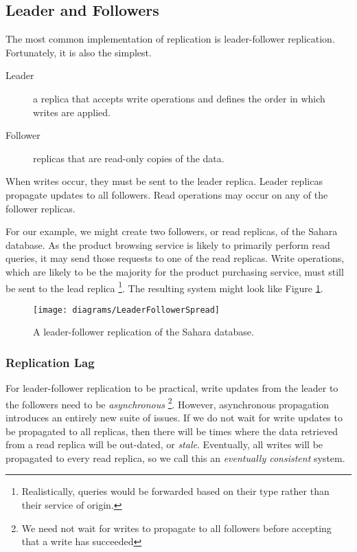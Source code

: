 \subsection{Leader and Followers}
The most common implementation of replication is leader-follower replication.
Fortunately, it is also the simplest.

\begin{description}
    \item[Leader] a replica that accepts write operations and defines the order in which writes are applied.
    \item[Follower] replicas that are read-only copies of the data. 
\end{description}

\noindent
When writes occur, they must be sent to the leader replica.
Leader replicas propagate updates to all followers.
Read operations may occur on any of the follower replicas.

For our example,
we might create two followers, or read replicas,
of the Sahara database.
As the product browsing service is likely to primarily perform read queries,
it may send those requests to one of the read replicas.
Write operations, which are likely to be the majority for the product purchasing service,
must still be sent to the lead replica%
\footnote{Realistically, queries would be forwarded based on their type rather than their service of origin.}.
The resulting system might look like Figure \ref{fig:sahara-leader-follower}.

\begin{figure}[H]
    \begin{center}
    \texttt{[image: diagrams/LeaderFollowerSpread]}
    \end{center}
    \caption{A leader-follower replication of the Sahara database.}
    \label{fig:sahara-leader-follower}
\end{figure}

\subsubsection*{Replication Lag}

For leader-follower replication to be practical,
write updates from the leader to the followers need to be \textsl{asynchronous}%
\footnote{We need not wait for writes to propagate to all followers before accepting that a write has succeeded}.
However, asynchronous propagation introduces an entirely new suite of issues.
If we do not wait for write updates to be propagated to all replicas,
then there will be times where the data retrieved from a read replica will be out-dated, or \textsl{stale}.
Eventually, all writes will be propagated to every read replica,
so we call this an \textsl{eventually consistent} system.

